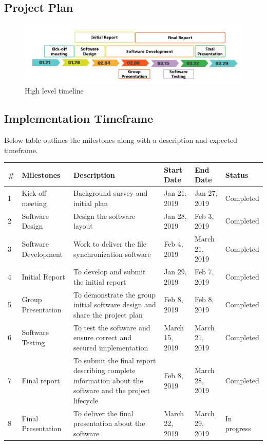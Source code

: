 \documentclass{article}
\begin{document}
\subsection{Project Plan}

\begin{figure}[h]
    \centering
    \includegraphics[width=1\textwidth]{timeline}
    \caption{High level timeline}
    \label{fig:timeline1}
\end{figure}

\subsection{Implementation Timeframe}
Below table outlines the milestones along with a description and expected timeframe.

\begin{center}
\begin{tabular}{ | m{3em} | m{2cm}| m{3cm} | m{1cm} | m{1cm} | m{2cm} |}
\hline
\textbf{\#} & \textbf{Milestones} & \textbf{Description} & \textbf{Start Date} & \textbf{End Date} & \textbf{Status}  \\
\hline
1 & Kick-off meeting & Background survey and initial plan & Jan 21, 2019 & Jan 27, 2019 & Completed \\
\hline
2 & Software Design  & Design the software layout & Jan 28, 2019 & Feb 3, 2019 & Completed \\
\hline
3 & Software Development & Work to deliver the file synchronization software & Feb 4, 2019 & March 21, 2019 & Completed \\
\hline
4 & Initial Report & To develop and submit the initial report & Jan 29, 2019 & Feb 7, 2019 & Completed \\
\hline
5 & Group Presentation & To demonstrate  the group initial software design and share the project plan & Feb 8, 2019 & Feb 8, 2019 & Completed \\
\hline
6 & Software Testing &  To test the software and ensure correct and secured implementation & March 15, 2019 & March 21, 2019 & Completed \\
\hline
7 & Final report & To submit the final report describing complete information about the software and the project lifecycle & Feb 8, 2019 & March 28, 2019 & Completed \\
\hline
8 & Final Presentation & To deliver the final presentation about the software & March 22, 2019 & March 29, 2019 & In progress \\
\hline
\end{tabular}
\end{center}
\end{document}
